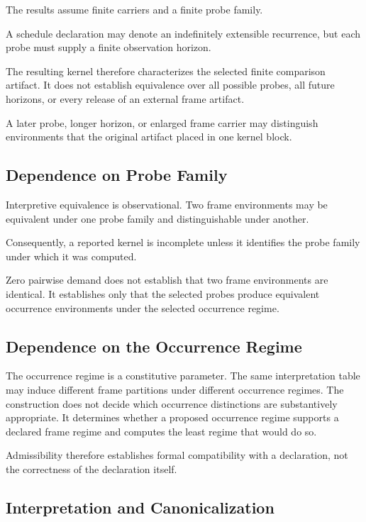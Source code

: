 \documentclass[11pt]{article}
\theoremstyle{plain}
\theoremstyle{definition}
\theoremstyle{remark}
\begin{document}
The results assume finite carriers
and a finite probe family.

A schedule declaration may denote
an indefinitely extensible recurrence,
but each probe must supply
a finite observation horizon.

The resulting kernel therefore characterizes
the selected finite comparison artifact.
It does not establish equivalence
over all possible probes,
all future horizons,
or every release
of an external frame artifact.

A later probe,
longer horizon,
or enlarged frame carrier
may distinguish environments
that the original artifact
placed in one kernel block.

\subsection{Dependence on Probe Family}

Interpretive equivalence is observational.
Two frame environments may be equivalent
under one probe family
and distinguishable under another.

Consequently, a reported kernel is incomplete
unless it identifies the probe family under which it was computed.

Zero pairwise demand does not establish
that two frame environments are identical.
It establishes only that the selected probes
produce equivalent occurrence environments
under the selected occurrence regime.

\subsection{Dependence on the Occurrence Regime}

The occurrence regime is a constitutive parameter.
The same interpretation table
may induce different frame partitions
under different occurrence regimes.
The construction does not decide
which occurrence distinctions
are substantively appropriate.
It determines whether a proposed occurrence regime
supports a declared frame regime and computes the least regime
that would do so.

Admissibility therefore establishes formal compatibility
with a declaration, not the correctness of the declaration itself.

\subsection{Interpretation and Canonicalization}
\end{document}
